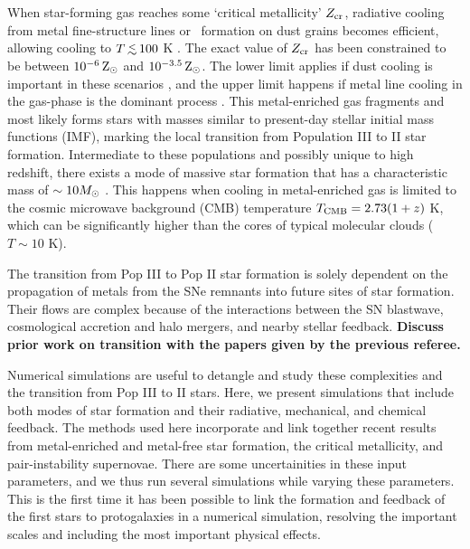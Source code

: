 \documentclass[useAMS,usenatbib]{mn2e}
\begin{document}
When star-forming gas reaches some `critical metallicity' $Z_{\rm
  cr}$, radiative cooling from metal fine-structure lines or
\hh~formation on dust grains becomes efficient, allowing cooling to $T
\lsim 100$ K \citep{Omukai??}.  The exact value of $Z_{\rm cr}$ has
been constrained to be between $10^{-6} {\rm\,Z_\odot}$ and $10^{-3.5} {\rm\,Z_\odot}$.
The lower limit applies if dust cooling is important in these
scenarios \citep{Omukai05, Schneider06_Frag, clark08}, and the upper
limit happens if metal line cooling in the gas-phase is the dominant
process \citep{Bromm01, 2009ApJ...691..441S}.  This metal-enriched gas
fragments and most likely forms stars with masses similar to
present-day stellar initial mass functions (IMF), marking the local
transition from Population III to II star formation.  Intermediate to
these populations and possibly unique to high redshift, there exists a
mode of massive star formation that has a characteristic mass of $\sim
10 \Ms$ \citep{Larson98, Tumlinson07_IMF, 2009ApJ...691..441S}.  This
happens when cooling in metal-enriched gas is limited to the cosmic
microwave background (CMB) temperature $T_{\rm CMB} = 2.73 (1+z)$ K,
which can be significantly higher than the cores of typical molecular
clouds ($T \sim 10$ K).

The transition from Pop III to Pop II star formation is solely
dependent on the propagation of metals from the SNe remnants into
future sites of star formation.  Their flows are complex because of
the interactions between the SN blastwave, cosmological accretion and
halo mergers, and nearby stellar feedback.  \textbf{Discuss prior work
  on transition with the papers given by the previous referee.}

%

Numerical simulations are useful to detangle and study these
complexities and the transition from Pop III to II stars.  Here, we
present simulations that include both modes of star formation and
their radiative, mechanical, and chemical feedback.  The methods used
here incorporate and link together recent results from metal-enriched
and metal-free star formation, the critical metallicity, and
pair-instability supernovae.  There are some uncertainities in these
input parameters, and we thus run several simulations while varying
these parameters.  This is the first time it has been possible to link
the formation and feedback of the first stars to protogalaxies in a
numerical simulation, resolving the important scales and including the
most important physical effects.
\end{document}

